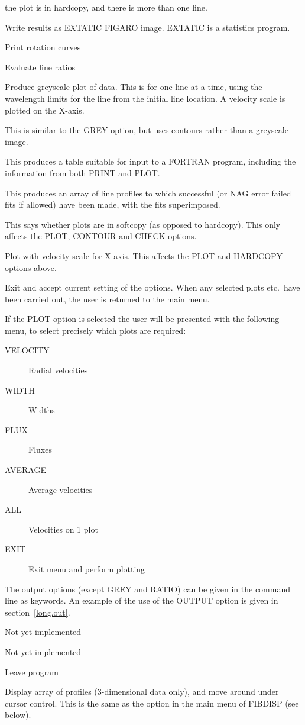 \begin{description}
\begin{description}
the plot is in hardcopy, and there is more than one line.
\item[STATIC] Write results as EXTATIC FIGARO image.
EXTATIC is a statistics program.
\item[PRINT] Print rotation curves
\item[RATIO] Evaluate line ratios
\item[GREY] Produce greyscale plot of data.
This is for one line at a time, using the wavelength limits for the line
from the initial line location.
A velocity scale is plotted on the X-axis.
\item[CONTOUR] This is similar to the GREY option, but uses contours
rather than a greyscale image.
\item[FULL] This produces a table suitable for input to a FORTRAN
program, including the information from both PRINT and PLOT.
\item[CHECK] This produces an array of line profiles to which successful
(or NAG error failed fits if allowed) have been made, with the fits
superimposed.
\item[SOFT] This says whether plots are in softcopy (as opposed to
hardcopy). This only affects the PLOT, CONTOUR and CHECK options.
\item[VELOCITY] Plot with velocity scale for X axis. This affects the PLOT
and HARDCOPY options above.
\item[EXIT] Exit and accept current setting of the options.
When any selected plots etc.\ have been carried out, the user is
returned to the main menu.

If the PLOT option is selected the user will be presented with the
following menu, to select precisely which plots are required:\\
\begin{description}
\item[VELOCITY] Radial velocities
\item[WIDTH] Widths
\item[FLUX] Fluxes
\item[AVERAGE] Average velocities
\item[ALL] Velocities on 1 plot
\item[EXIT] Exit menu and perform plotting
\end{description}
\end{description}
The output options (except GREY and RATIO) can be given in the command
line as keywords.
An example of the use of the OUTPUT option is given in
section~\ref{long.out}.
\item[SKY] Not yet implemented
\item[SYNTHETIC] Not yet implemented
\item[EXIT] Leave program
\item[CUBAN] Display array of profiles (3-dimensional data only), and move
around under cursor control. This is the same as the option in the main menu
of FIBDISP (see below).
\end{description}


